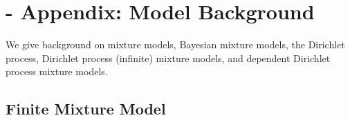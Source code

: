 \documentclass[twocolumn, final]{svjour3}
\begin{document}

\appendix

\newpage

\section{-  Appendix: Model Background}
\label{sec:modelbackground}



We give background on mixture models, Bayesian mixture models, the Dirichlet process, Dirichlet process (infinite) mixture models, and dependent Dirichlet process mixture models.


\subsection{Finite Mixture Model}
\label{sec:finitemixture}
\end{document}
